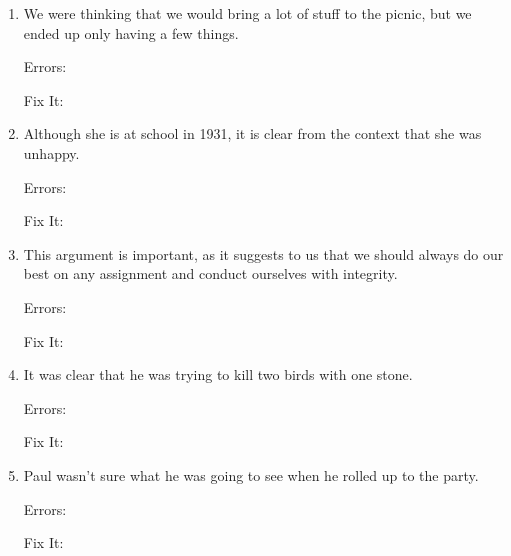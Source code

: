 \begin{enumerate}
\item We were thinking that we would bring a lot of stuff to the picnic, but we ended up only
having a few things.

Errors: \hrulefill

Fix It: \hrulefill

\hrulefill

\item Although she is at school in 1931, it is clear from the context that she was unhappy.

Errors: \hrulefill

Fix It: \hrulefill

\hrulefill

\item This argument is important, as it suggests to us that we should always do our best on any
assignment and conduct ourselves with integrity.

Errors: \hrulefill

Fix It: \hrulefill

\hrulefill

\item It was clear that he was trying to kill two birds with one stone.

Errors: \hrulefill

Fix It: \hrulefill

\hrulefill

\item Paul wasn't sure what he was going to see when he rolled up to the party.

Errors: \hrulefill

Fix It: \hrulefill

\hrulefill
\end{enumerate}
